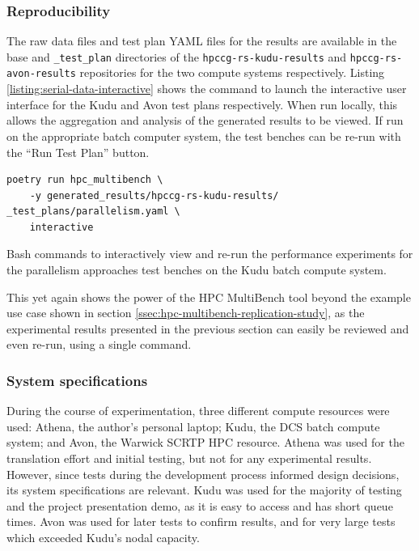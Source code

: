 \subsubsection{Reproducibility}
\label{sssec:parallelism-approaches-reproducibility}

The raw data files and test plan YAML files for the results are available in the base and \texttt{\_test\_plan} directories of the \texttt{hpccg-rs-kudu-results} and \texttt{hpccg-rs-avon-results} repositories for the two compute systems respectively. Listing \ref{listing:serial-data-interactive} shows the command to launch the interactive user interface for the Kudu and Avon test plans respectively. When run locally, this allows the aggregation and analysis of the generated results to be viewed. If run on the appropriate batch computer system, the test benches can be re-run with the ``Run Test Plan'' button.

\begin{code}
    \begin{verbatim}
poetry run hpc_multibench \
    -y generated_results/hpccg-rs-kudu-results/ _test_plans/parallelism.yaml \
    interactive
    \end{verbatim}
    \caption{Bash commands to interactively view and re-run the performance experiments for the parallelism approaches test benches on the Kudu batch compute system.}
    \label{listing:serial-data-interactive}
\end{code}

This yet again shows the power of the HPC MultiBench tool beyond the example use case shown in section \ref{ssec:hpc-multibench-replication-study}, as the experimental results presented in the previous section can easily be reviewed and even re-run, using a single command.


\subsubsection{System specifications}
\label{sssec:system-specifications}

During the course of experimentation, three different compute resources were used: Athena, the author's personal laptop; Kudu, the DCS batch compute system; and Avon, the Warwick SCRTP \acrshort{HPC} resource. Athena was used for the translation effort and initial testing, but not for any experimental results. However, since tests during the development process informed design decisions, its system specifications are relevant. Kudu was used for the majority of testing and the project presentation demo, as it is easy to access and has short queue times. Avon was used for later tests to confirm results, and for very large tests which exceeded Kudu's nodal capacity.

